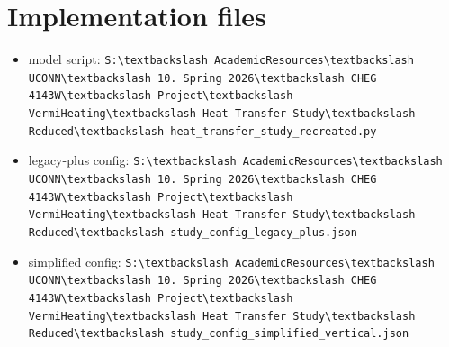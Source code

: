 \documentclass[11pt]{article}
\newcommand{\filepath}[1]{\nolinkurl{#1}}
\begin{document}
\section{Implementation files}
\begin{itemize}[leftmargin=*]
\item model script:
\filepath{S:\textbackslash AcademicResources\textbackslash UCONN\textbackslash 10. Spring 2026\textbackslash CHEG 4143W\textbackslash Project\textbackslash VermiHeating\textbackslash Heat Transfer Study\textbackslash Reduced\textbackslash heat\_transfer\_study\_recreated.py}
\item legacy-plus config:
\filepath{S:\textbackslash AcademicResources\textbackslash UCONN\textbackslash 10. Spring 2026\textbackslash CHEG 4143W\textbackslash Project\textbackslash VermiHeating\textbackslash Heat Transfer Study\textbackslash Reduced\textbackslash study\_config\_legacy\_plus.json}
\item simplified config:
\filepath{S:\textbackslash AcademicResources\textbackslash UCONN\textbackslash 10. Spring 2026\textbackslash CHEG 4143W\textbackslash Project\textbackslash VermiHeating\textbackslash Heat Transfer Study\textbackslash Reduced\textbackslash study\_config\_simplified\_vertical.json}
\end{itemize}
\end{document}
